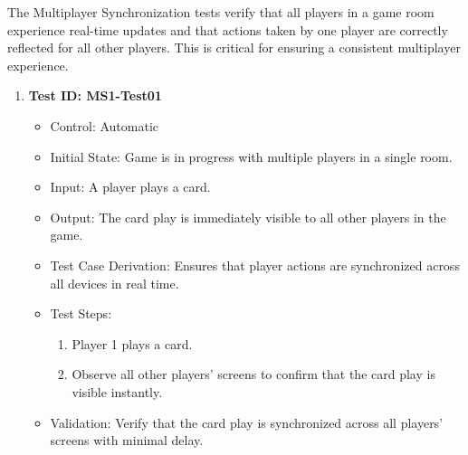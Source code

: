 \documentclass[12pt, titlepage]{article}
\begin{document}
The Multiplayer Synchronization tests verify that all players in a game room experience real-time updates and that actions taken by one player are correctly reflected for all other players. This is critical for ensuring a consistent multiplayer experience.

\begin{enumerate}
    \item \textbf{Test ID: MS1-Test01}
        \begin{itemize}
            \item Control: Automatic
            \item Initial State: Game is in progress with multiple players in a single room.
            \item Input: A player plays a card.
            \item Output: The card play is immediately visible to all other players in the game.
            \item Test Case Derivation: Ensures that player actions are synchronized across all devices in real time.
            \item Test Steps:
                \begin{enumerate}
                    \item Player 1 plays a card.
                    \item Observe all other players’ screens to confirm that the card play is visible instantly.
                \end{enumerate}
            \item Validation: Verify that the card play is synchronized across all players' screens with minimal delay.
        \end{itemize}


\end{enumerate}
\end{document}
